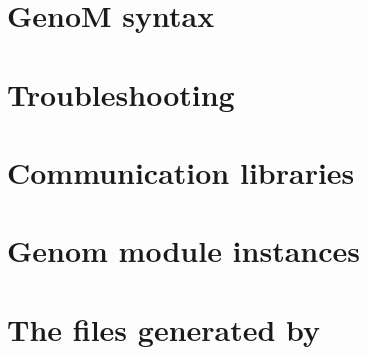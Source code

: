 \documentclass[a4paper,11pt]{book}
\begin{document}
\chapter{GenoM syntax}
\label{cha|syntax}



\appendix

\chapter{Troubleshooting}
\label{anx|troubles}


\chapter{Communication libraries}
\label{anx|posters}


\chapter{Genom module instances}
\label{anx|instances}


\chapter[The files generated by GenoM]{The files generated by \GenoM}
\label{anx|files}


\end{document}
